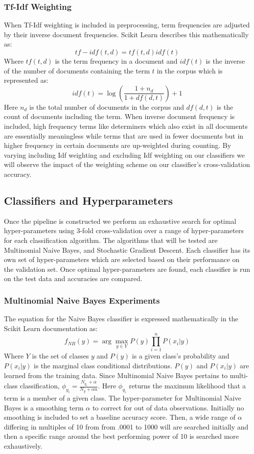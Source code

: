 \documentclass[a4paper, 12pt]{article}
\begin{document}
\subsubsection{Tf-Idf Weighting}
When Tf-Idf weighting is included in preprocessing, term frequencies are adjusted by their inverse document frequencies. Scikit Learn \cite{pedregosa2011scikit} describes this mathematically as: 
\[tf-idf(t,d)=tf(t,d)idf(t)\]
Where $tf(t,d)$ is the term frequency in a document and $idf(t)$ is the inverse of the number of documents containing the term $t$ in the corpus which is represented as:
\[idf(t)=\log(\frac{1+n_d}{1+df(d,t)}) +1\]
Here $n_d$ is the total number of documents in the corpus and $df(d,t)$ is the count of documents including the term. When inverse document frequency is included, high frequency terms like determiners which also exist in all documents are essentially meaningless while terms that are used in fewer documents but in higher frequency in certain documents are up-weighted during counting.  By varying including Idf weighting and excluding Idf weighting on our classifiers we will observe the impact of the weighting scheme on our classifier's cross-validation accuracy.
\subsection{Classifiers and Hyperparameters}
Once the pipeline is constructed we perform an exhaustive search for optimal hyper-parameters using 3-fold cross-validation over a range of hyper-parameters for each classification algorithm. The algorithms that will be tested are Multinomial Naive Bayes, and Stochastic Gradient Descent.  Each classifier has its own set of hyper-parameters which are selected based on their performance on the validation set. Once optimal hyper-parameters are found, each classifier is run on the test data and accuracies are compared.
\subsubsection{Multinomial Naive Bayes Experiments}
The equation for the Naive Bayes classifier is expressed mathematically in the Scikit Learn documentation \cite{pedregosa2011scikit} as: \[f_{NB}(y)=\arg\max_{y\in Y} P(y) \prod_{i=1}^{n} P(x_i|y)\]
Where $Y$ is the set of classes $y$ and $P(y)$ is a given class's probability and $P(x_i|y)$ is the marginal class conditional distributions.  $P(y)$ and $P(x_i|y)$ are learned from the training data. Since Multinomial Naive Bayes pertains to multi-class classification, $\phi_{y_i}=\frac{N_{y_i}+\alpha}{N_y +\alpha n}$. Here $\phi_{y_i}$  returns the maximum likelihood that a term is a member of a given class. The hyper-parameter for Multinomial Naive Bayes is a smoothing term $\alpha$ to correct for out of data observations.  Initially no smoothing is included to set a baseline accuracy score. Then, a wide range of $\alpha$ differing in multiples of 10 from from .0001 to 1000 will are searched initially and then a specific range around the best performing power of 10 is searched more exhaustively.
\end{document}

